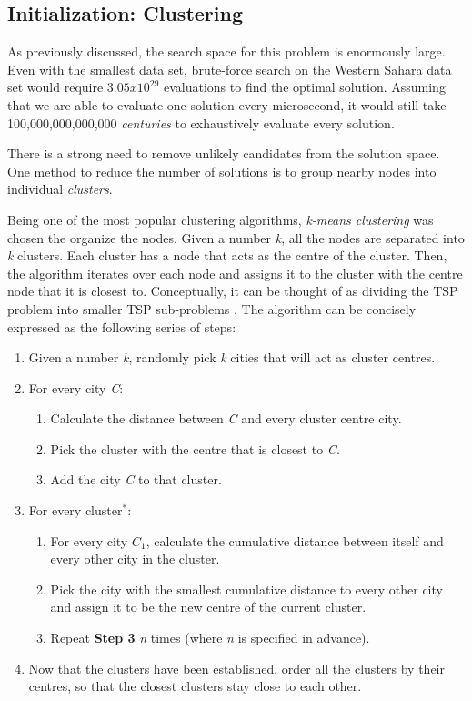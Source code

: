 \documentclass[12pt,twocolumn,oneside]{osajnl}
\begin{document}
\subsection{Initialization: Clustering}

As previously discussed, the search space for this problem is enormously large. Even with the smallest data set, brute-force search on the Western Sahara data set would require $3.05x10^{29}$ evaluations to find the optimal solution. Assuming that we are able to evaluate one solution every microsecond, it would still take 100,000,000,000,000 \textit{centuries} to exhaustively evaluate every solution.

There is a strong need to remove unlikely candidates from the solution space. One method to reduce the number of solutions is to group nearby nodes into individual \textit{clusters}. 

Being one of the most popular clustering algorithms, \textit{k-means clustering} was chosen the organize the nodes. Given a number \textit{k}, all the nodes are separated into \textit{k} clusters. Each cluster has a node that acts as the centre of the cluster. Then, the algorithm iterates over each node and assigns it to the cluster with the centre node that it is closest to. Conceptually, it can be thought of as dividing the TSP problem into smaller TSP sub-problems\cite{hartigan1979algorithm} \cite{wilkin2007k}. The algorithm can be concisely expressed as the following series of steps:

\begin{enumerate}
    \item Given a number \textit{k}, randomly pick \textit{k} cities that will act as cluster centres.
    \item For every city \textit{C}:
    \begin{enumerate}
        \item Calculate the distance between \textit{C} and every cluster centre city.
        \item Pick the cluster with the centre that is closest to \textit{C}.
        \item Add the city \textit{C} to that cluster.
    \end{enumerate}  
    \item For every cluster$^{*}$:
    \begin{enumerate}
        \item For every city \textit{$C_1$}, calculate the cumulative distance between itself and every other city in the cluster.
        \item Pick the city with the smallest cumulative distance to every other city and assign it to be the new centre of the current cluster.
        \item Repeat \textbf{Step 3} \textit{n} times (where \textit{n} is specified in advance).
    \end{enumerate}
    \item Now that the clusters have been established, order all the clusters by their centres, so that the closest clusters stay close to each other.
\end{enumerate}
\end{document}
